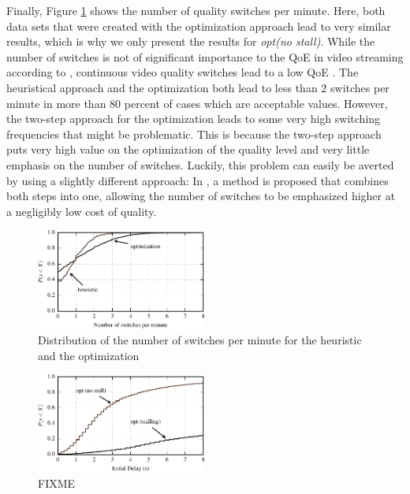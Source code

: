 Finally, Figure \ref{fig:switches} shows the number of quality switches per minute. Here, both data sets that were created with the optimization approach lead to very similar results, which is why we only present the results for \textit{opt(no stall)}. While the number of switches is not of significant importance to the QoE in video streaming according to \cite{seufert2015survey}, continuous video quality switches lead to a low QoE \cite{liu2013user}. The heuristical approach and the optimization both lead to less than $2$ switches per minute in more than $80$ percent of cases which are acceptable values. However, the two-step approach for the optimization leads to some very high switching frequencies that might be problematic. This is because the two-step approach puts very high value on the optimization of the quality level and very little emphasis on the number of switches. Luckily, this problem can easily be averted by using a slightly different approach: In \cite{liotou2016enriching}, a method is proposed that combines both steps into one, allowing the number of switches to be emphasized higher at a negligibly low cost of quality.

\begin{figure}[t]
\centering
\includegraphics[width=0.5\textwidth]{figs/switches_py}%
\caption{Distribution of the number of switches per minute for the heuristic and the optimization}
\label{fig:switches}%
\end{figure}

\begin{figure}[t]
\centering
\includegraphics[width=0.5\textwidth]{figs/initial_delay_py}%
\caption{FIXME}
\label{fig:initial_delay}%
\end{figure}